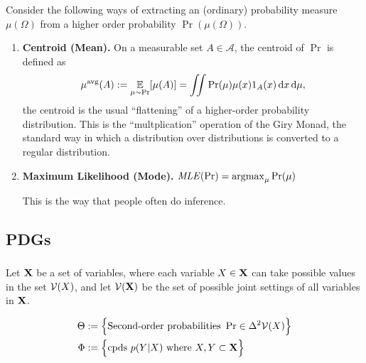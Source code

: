 \documentclass{article}
\begin{document}
\[
\]



Consider the following ways of extracting an (ordinary) probability measure $\mu(\Omega)$
from a higher order probability $\Pr(\mu(\Omega))$.

\begin{enumerate}
    \item \textbf{Centroid (Mean).}
        On a measurable set $A \in \mathcal A$, the centroid of $\Pr$ is defined as
        \[
            \mu^{\text{avg}}(A) := \operatorname*{\mathbb{E}}_{\mu \sim \Pr}[ \mu(A)] =
                \iint \Pr(\mu) \mu(x) 1_{A}(x)\, \mathrm d x\,\mathrm d\mu,
        \]
        the centroid is the usual ``flattening'' of a higher-order probability distribution.
        This is the ``multplication'' operation of the Giry Monad, the standard way in which a distribution over distributions is converted to a regular distribution.

    \item \textbf{Maximum Likelihood (Mode).}
        $\mathit{MLE}(\Pr) = \operatorname*{\arg\!\max}_\mu \Pr(\mu)$

        This is the way that people often do inference.


\end{enumerate}


\subsection{PDGs}


\subsubsection{}
Let $\mathbf{X}$ be a set of variables, where each variable $X \in \mathbf{X}$ can take possible values in the set $\mathcal V(X)$, and let $\mathcal V(\mathbf{X})$ be the set of possible joint settings of all variables in $\mathbf{X}$. 

\begin{align*}
    \Theta &:=
        \Big\{ 
        \text{Second-order probabilities}~ \Pr \in \Delta^2 \mathcal V(X)
        \Big\} \\
    \Phi &:= \Big\{ \text{cpds}~ p(Y|X) 
        \text{ where }  X, Y \subset \mathbf{X} \Big\}
\end{align*}
\end{document}
